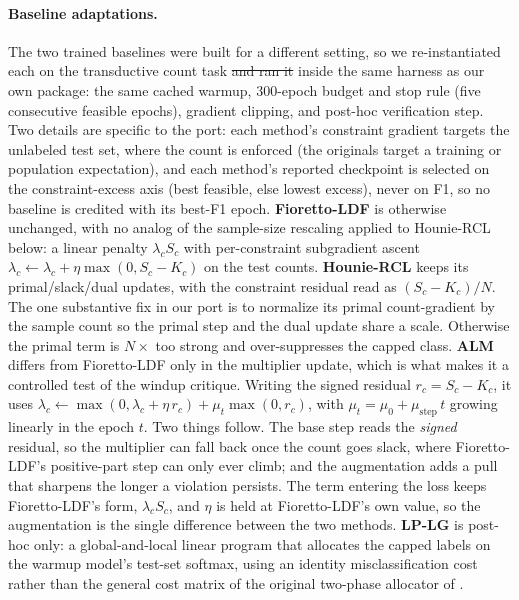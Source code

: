 \documentclass[10pt]{article}
\newcommand{\del}[1]{{\color{red}\sout{#1}}}
\begin{document}
\paragraph{Baseline adaptations.}
The two trained baselines were built for a different setting, so we
re-instantiated each on the transductive count task \del{and ran it }inside the
same harness as our own package: the same cached warmup, $300$-epoch budget
and stop rule (five consecutive feasible epochs), gradient clipping, and
post-hoc verification step. Two details are specific to the port: each
method's constraint gradient targets the unlabeled test set, where the
count is enforced (the originals target a training or population
expectation), and each method's reported checkpoint is selected on the
constraint-excess axis (best feasible, else lowest excess), never on F1, so
no baseline is credited with its best-F1 epoch. \textbf{Fioretto-LDF} is
otherwise unchanged, with no analog of the sample-size rescaling applied to
Hounie-RCL below: a linear penalty $\lambda_c S_c$ with per-constraint
subgradient ascent
$\lambda_c\!\leftarrow\!\lambda_c+\eta\max(0,S_c\!-\!K_c)$ on the test
counts. \textbf{Hounie-RCL} keeps its primal/slack/dual updates, with the
constraint residual read as $(S_c\!-\!K_c)/N$. The one substantive fix in
our port is to normalize its primal count-gradient by the sample count so
the primal step and the dual update share a scale. Otherwise the primal
term is $N\times$ too strong and over-suppresses the capped class.
{\color{blue}\textbf{ALM} differs from Fioretto-LDF only in the multiplier update,
which is what makes it a controlled test of the windup critique. Writing the
signed residual $r_c\!=\!S_c\!-\!K_c$, it uses
$\lambda_c\!\leftarrow\!\max(0,\lambda_c\!+\!\eta\,r_c)+\mu_t\max(0,r_c)$, with
$\mu_t\!=\!\mu_0\!+\!\mu_{\mathrm{step}}\,t$ growing linearly in the epoch $t$.
Two things follow. The base step reads the \emph{signed} residual, so the
multiplier can fall back once the count goes slack, where Fioretto-LDF's
positive-part step can only ever climb; and the augmentation adds a pull that
sharpens the longer a violation persists. The term entering the loss keeps
Fioretto-LDF's form, $\lambda_c S_c$, and $\eta$ is held at Fioretto-LDF's own
value, so the augmentation is the single difference between the two methods.}
\textbf{LP-LG} is post-hoc only: a global-and-local linear program that
allocates the capped labels on the warmup model's test-set softmax, using
an identity misclassification cost rather than the general cost matrix
of the original two-phase allocator of
\citet{shifman2025classification}.
\end{document}
